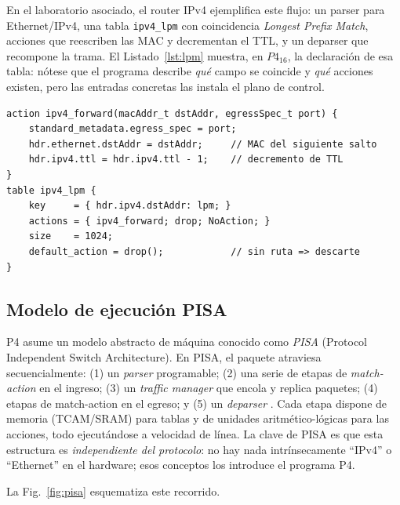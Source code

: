 \documentclass[conference,onecolumn,10pt]{IEEEtran}
\begin{document}
En el laboratorio asociado, el router IPv4 ejemplifica este flujo: un parser para
Ethernet/IPv4, una tabla \texttt{ipv4\_lpm} con coincidencia \emph{Longest Prefix
Match}, acciones que reescriben las MAC y decrementan el TTL, y un deparser que
recompone la trama. El Listado~\ref{lst:lpm} muestra, en $P4_{16}$, la
declaración de esa tabla: nótese que el programa describe \emph{qué} campo se
coincide y \emph{qué} acciones existen, pero las entradas concretas las instala
el plano de control.

\begin{lstlisting}[style=p4, caption={Tabla de enrutamiento LPM en P4 (extracto del router del laboratorio).}, label={lst:lpm}]
action ipv4_forward(macAddr_t dstAddr, egressSpec_t port) {
    standard_metadata.egress_spec = port;
    hdr.ethernet.dstAddr = dstAddr;     // MAC del siguiente salto
    hdr.ipv4.ttl = hdr.ipv4.ttl - 1;    // decremento de TTL
}
table ipv4_lpm {
    key     = { hdr.ipv4.dstAddr: lpm; }
    actions = { ipv4_forward; drop; NoAction; }
    size    = 1024;
    default_action = drop();            // sin ruta => descarte
}
\end{lstlisting}

\subsection{Modelo de ejecución PISA}
P4 asume un modelo abstracto de máquina conocido como \emph{PISA} (Protocol
Independent Switch Architecture). En PISA, el paquete atraviesa secuencialmente:
(1) un \emph{parser} programable; (2) una serie de etapas de \emph{match-action}
en el ingreso; (3) un \emph{traffic manager} que encola y replica paquetes; (4)
etapas de match-action en el egreso; y (5) un \emph{deparser}
\cite{bosshart2013rmt, p4spec}. Cada etapa dispone de memoria (TCAM/SRAM) para
tablas y de unidades aritmético-lógicas para las acciones, todo ejecutándose a
velocidad de línea. La clave de PISA es que esta estructura es
\emph{independiente del protocolo}: no hay nada intrínsecamente ``IPv4'' o
``Ethernet'' en el hardware; esos conceptos los introduce el programa P4.

La Fig.~\ref{fig:pisa} esquematiza este recorrido.
\end{document}
